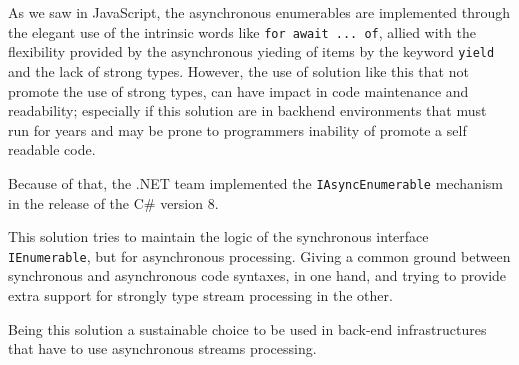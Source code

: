 As we saw in JavaScript, the asynchronous enumerables are implemented through the elegant use of the intrinsic words like \texttt{for await ... of}, allied with the flexibility provided by the asynchronous yieding of items by the keyword \texttt{yield} and the lack of strong types. 
However, the use of solution like this that not promote the use of strong types, can have impact in code maintenance and readability; especially if this solution are in backhend environments that must run for years and may be prone to programmers inability of promote a self readable code.

Because of that, the .NET team implemented the \texttt{IAsyncEnumerable} mechanism in the release of the C\# version 8. 

This solution tries to maintain the logic of the synchronous interface \texttt{IEnumerable}, but for asynchronous processing.
Giving a common ground between synchronous and asynchronous code syntaxes, in one hand, and trying to provide extra support for strongly type stream processing in the other.

Being this solution a sustainable choice to be used in back-end infrastructures that have to use asynchronous streams processing.


